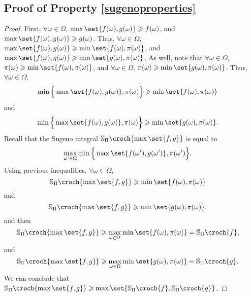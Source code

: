 \subsection{Proof of Property \ref{sugenoproperties}}
\label{sugenoproperties_RETURN}
\begin{proof}
First, $\forall \omega \in \Omega$, 
$\max \set{ f(\omega), g(\omega) } \geqslant f(\omega)$, and $\max \set{ f(\omega), g(\omega) } \geqslant g(\omega)$.
Thus, $\forall \omega \in \Omega$, $\max \set{ f(\omega), g(\omega) } \geqslant \min \set{f(\omega),\pi(\omega)}$, 
and $\max \set{ f(\omega), g(\omega) } \geqslant \min \set{g(\omega), \pi(\omega)}$.
As well, note that $\forall \omega \in \Omega$, $\pi(\omega) \geqslant \min \set{ f(\omega), \pi(\omega) }$,
and $\forall \omega \in \Omega$, $\pi(\omega) \geqslant \min \set{ g(\omega), \pi(\omega) }$.
Thus, $\forall \omega \in \Omega$,
\[ \min \Big\{ \max \set{ f(\omega), g(\omega)} , \pi(\omega) \Big\} \geqslant \min \set{ f(\omega), \pi(\omega) } \]
and
\[ \min \Big\{ \max \set{ f(\omega), g(\omega)} , \pi(\omega) \Big\} \geqslant \min \set{ g(\omega), \pi(\omega) }. \]
Recall that the Sugeno integral $\mathbb{S}_{\Pi} \croch{ \max \set{f,g} }$ is equal to 
\[ \max_{\omega' \in \Omega} \min \Big\{ \max \set{ f(\omega'), g(\omega') }, \pi(\omega')  \Big\}.\]
Using previous inequalities, $\forall \omega \in \Omega$, 
\[ \mathbb{S}_{\Pi} \croch{ \max \set{f,g} } \geqslant \min \set{ f(\omega), \pi(\omega) }\] and
\[ \mathbb{S}_{\Pi} \croch{ \max \set{f,g} } \geqslant \min \set{ g(\omega), \pi(\omega) }, \] and then
\[ \mathbb{S}_{\Pi} \croch{ \max \set{f,g} } \geqslant \max_{\omega \in \Omega}\min \set{ f(\omega), \pi(\omega) } = \mathbb{S}_{\Pi} \croch{f}, \] 
and
\[ \mathbb{S}_{\Pi} \croch{ \max \set{f,g} } \geqslant \max_{\omega \in \Omega} \min \set{ g(\omega), \pi(\omega) } = \mathbb{S}_{\Pi} \croch{g}.\]
We can conclude that $\mathbb{S}_{\Pi} \croch{\max\set{f,g}} \geqslant \max \set{\mathbb{S}_{\Pi}\croch{f}, \mathbb{S}_{\Pi}\croch{g} }$.


\end{proof}
